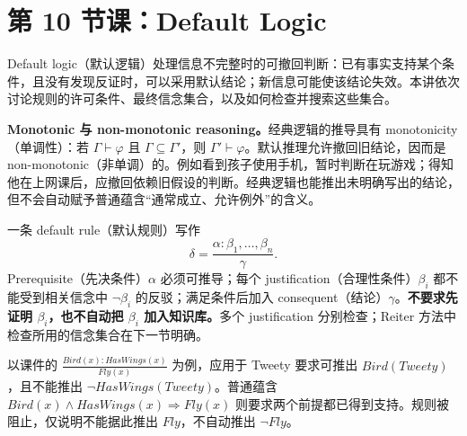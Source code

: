 \begingroup
\renewcommand{\recordid}[1]{}
\renewcommand{\relatedexercise}[2]{\hyperref[exercise:#1]{#2}}

\section{第 10 节课：Default Logic}
\label{lecture:SC3000-L10}


Default logic（默认逻辑）处理信息不完整时的可撤回判断：已有事实支持某个条件，且没有发现反证时，可以采用默认结论；新信息可能使该结论失效。本讲依次讨论规则的许可条件、最终信念集合，以及如何检查并搜索这些集合。


\textbf{Monotonic 与 non-monotonic reasoning。}经典逻辑的推导具有 monotonicity（单调性）：若 $\Gamma\vdash\varphi$ 且 $\Gamma\subseteq\Gamma'$，则 $\Gamma'\vdash\varphi$。默认推理允许撤回旧结论，因而是 non-monotonic（非单调）的。例如看到孩子使用手机，暂时判断在玩游戏；得知他在上网课后，应撤回依赖旧假设的判断。经典逻辑也能推出未明确写出的结论，但不会自动赋予普通蕴含“通常成立、允许例外”的含义。

一条 default rule（默认规则）写作
\[
 \delta=\frac{\alpha:\beta_1,\ldots,\beta_n}{\gamma}.
\]
Prerequisite（先决条件）$\alpha$ 必须可推导；每个 justification（合理性条件）$\beta_i$ 都不能受到相关信念中 $\neg\beta_i$ 的反驳；满足条件后加入 consequent（结论）$\gamma$。\textbf{不要求先证明 $\beta_i$，也不自动把 $\beta_i$ 加入知识库。}多个 justification 分别检查；Reiter 方法中检查所用的信念集合在下一节明确。

以课件的 $\frac{Bird(x):HasWings(x)}{Fly(x)}$ 为例，应用于 Tweety 要求可推出 $Bird(Tweety)$，且不能推出 $\neg HasWings(Tweety)$。普通蕴含 $Bird(x)\land HasWings(x)\Rightarrow Fly(x)$ 则要求两个前提都已得到支持。规则被阻止，仅说明不能据此推出 $Fly$，不自动推出 $\neg Fly$。


